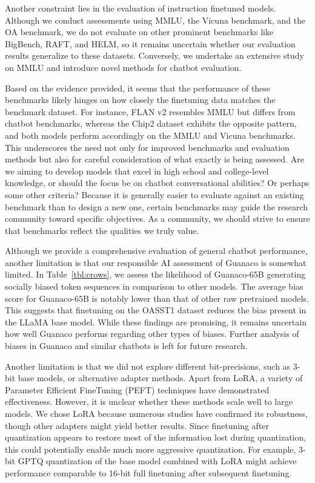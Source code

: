 Another constraint lies in the evaluation of instruction finetuned models. Although we conduct assessments using MMLU, the Vicuna benchmark, and the OA benchmark, we do not evaluate on other prominent benchmarks like BigBench, RAFT, and HELM, so it remains uncertain whether our evaluation results generalize to these datasets. Conversely, we undertake an extensive study on MMLU and introduce novel methods for chatbot evaluation.

Based on the evidence provided, it seems that the performance of these benchmarks likely hinges on how closely the finetuning data matches the benchmark dataset. For instance, FLAN v2 resembles MMLU but differs from chatbot benchmarks, whereas the Chip2 dataset exhibits the opposite pattern, and both models perform accordingly on the MMLU and Vicuna benchmarks. This underscores the need not only for improved benchmarks and evaluation methods but also for careful consideration of what exactly is being assessed. Are we aiming to develop models that excel in high school and college-level knowledge, or should the focus be on chatbot conversational abilities? Or perhaps some other criteria? Because it is generally easier to evaluate against an existing benchmark than to design a new one, certain benchmarks may guide the research community toward specific objectives. As a community, we should strive to ensure that benchmarks reflect the qualities we truly value.

Although we provide a comprehensive evaluation of general chatbot performance, another limitation is that our responsible AI assessment of {Guanaco} is somewhat limited. In Table~\ref{tbl:crows}, we assess the likelihood of {Guanaco}-65B generating socially biased token sequences in comparison to other models. The average bias score for {Guanaco}-65B is notably lower than that of other raw pretrained models. This suggests that finetuning on the OASST1 dataset reduces the bias present in the LLaMA base model. While these findings are promising, it remains uncertain how well {Guanaco} performs regarding other types of biases. Further analysis of biases in {Guanaco} and similar chatbots is left for future research.

Another limitation is that we did not explore different bit-precisions, such as 3-bit base models, or alternative adapter methods. Apart from LoRA, a variety of Parameter Efficient FineTuning (PEFT) techniques have demonstrated effectiveness. However, it is unclear whether these methods scale well to large models. We chose LoRA because numerous studies have confirmed its robustness, though other adapters might yield better results. Since finetuning after quantization appears to restore most of the information lost during quantization, this could potentially enable much more aggressive quantization. For example, 3-bit GPTQ quantization of the base model combined with LoRA might achieve performance comparable to 16-bit full finetuning after subsequent finetuning.

